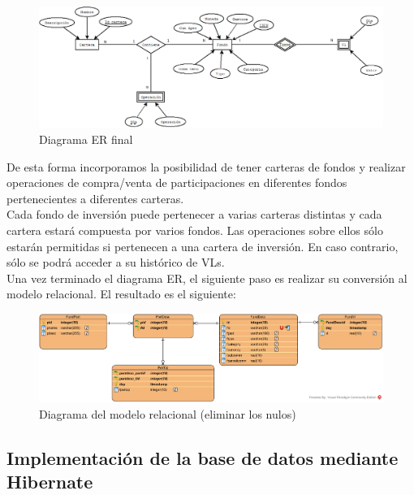 \documentclass[12pt, a4paper]{book}
\begin{document}
\begin{figure}[htbp]
	\centering
	\includegraphics[width=\textwidth]{figuras/ERCompleto.png}
	\caption{Diagrama ER final}
	\label{fig:erfinal}
	\end {figure}



De esta forma incorporamos la posibilidad de tener carteras de fondos y realizar operaciones de compra/venta de participaciones en diferentes fondos pertenecientes a diferentes carteras.\\

Cada fondo de inversión puede pertenecer a varias carteras distintas y cada cartera estará compuesta por varios fondos. Las operaciones sobre ellos sólo estarán permitidas si pertenecen a una cartera de inversión. En caso contrario, sólo se podrá acceder a su histórico de \gls{VL}s.\\

Una vez terminado el diagrama \gls{ER}, el siguiente paso es realizar su conversión al modelo relacional. El resultado es el siguiente:\\

\begin{figure}[htbp]
	\centering
	\includegraphics[width=\textwidth]{figuras/DiagramaR.png}
	\caption{Diagrama del modelo relacional (eliminar los nulos)}
	\label{fig:relacional}
	\end {figure}
	
\newpage

\subsection{Implementación de la base de datos mediante Hibernate}
\end{document}
